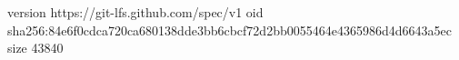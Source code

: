 version https://git-lfs.github.com/spec/v1
oid sha256:84e6f0cdca720ca680138dde3bb6cbcf72d2bb0055464e4365986d4d6643a5ec
size 43840
